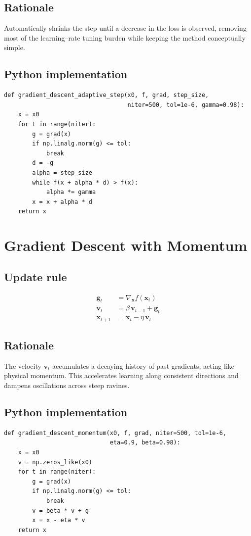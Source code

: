 \documentclass[12pt]{article}
\begin{document}
\subsection*{Rationale}
Automatically shrinks the step until a decrease in the loss is observed,
removing most of the learning--rate tuning burden while keeping the method
conceptually simple.

\subsection*{Python implementation}
\begin{lstlisting}
def gradient_descent_adaptive_step(x0, f, grad, step_size,
                                   niter=500, tol=1e-6, gamma=0.98):
    x = x0
    for t in range(niter):
        g = grad(x)
        if np.linalg.norm(g) <= tol:
            break
        d = -g
        alpha = step_size
        while f(x + alpha * d) > f(x):
            alpha *= gamma
        x = x + alpha * d
    return x
\end{lstlisting}

\section{Gradient Descent with Momentum}
\subsection*{Update rule}
\begin{align}
\bm g_t  &= \nabla_{\!\bm x}f(\bm x_t) \\
\bm v_t  &= \beta\,\bm v_{t-1} + \bm g_t \\
\bm x_{t+1} &= \bm x_t - \eta\,\bm v_t
\end{align}

\subsection*{Rationale}
The velocity $\bm v_t$ accumulates a decaying history of past gradients,
acting like physical momentum.  This accelerates learning along consistent
directions and dampens oscillations across steep ravines.

\subsection*{Python implementation}
\begin{lstlisting}
def gradient_descent_momentum(x0, f, grad, niter=500, tol=1e-6,
                              eta=0.9, beta=0.98):
    x = x0
    v = np.zeros_like(x0)
    for t in range(niter):
        g = grad(x)
        if np.linalg.norm(g) <= tol:
            break
        v = beta * v + g
        x = x - eta * v
    return x
\end{lstlisting}
\end{document}
